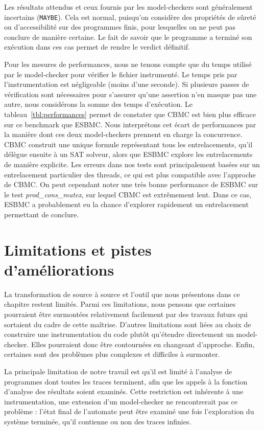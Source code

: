 Les résultats attendus et ceux fournis par les model-checkers sont généralement
incertains (\texttt{MAYBE}). Cela est normal, puisqu’on considère des
propriétés de sûreté ou d'accessibilité sur des programmes finis, pour
lesquelles on ne peut pas conclure de manière certaine. Le fait de savoir que le
programme a terminé son exécution dans ces cas permet de rendre le
verdict définitif.

Pour les mesures de performances, nous ne tenons compte que du temps utilisé par
le model-checker pour vérifier le fichier instrumenté. Le temps pris par
l'instrumentation est négligeable (moins d'une seconde). Si plusieurs passes de
vérification sont nécessaires pour s'assurer qu'une assertion n'en masque pas
une autre, nous considérons la somme des temps d'exécution. Le
tableau~\ref{tbl:performances} permet de constater que CBMC est bien plus
efficace sur ce benchmark que ESBMC. Nous interprétons cet écart de performances
par la manière dont ces deux model-checkers prennent en charge la concurrence.
CBMC construit une unique formule représentant tous les entrelacements, qu'il
délègue ensuite à un SAT solveur, alors que ESBMC explore les entrelacements de
manière explicite. Les erreurs dans nos tests sont principalement basées sur un
entrelacement particulier des threads, ce qui est plus compatible avec
l'approche de CBMC. On peut cependant noter une très bonne performance de ESBMC
sur le test \emph{prod\_cons\_mutex}, sur lequel CBMC est extrêmement lent. Dans
ce cas, ESBMC a probablement eu la chance d'explorer rapidement un entrelacement
permettant de conclure.

\section{Limitations et pistes d'améliorations}

La transformation de source à source et l'outil que nous présentons dans ce
chapitre restent limités. Parmi ces limitations, nous pensons que certaines
pourraient être surmontées relativement facilement par des travaux futurs qui
sortaient du cadre de cette maîtrise. D'autres limitations sont liées au choix
de construire une instrumentation du code plutôt qu'étendre directement un
model-checker. Elles pourraient donc être contournées en changeant d'approche.
Enfin, certaines sont des problèmes plus complexes et difficiles à surmonter.

La principale limitation de notre travail est qu'il est limité à l'analyse de
programmes dont toutes les traces terminent, afin que les appels à la fonction
d'analyse des résultats soient examinés. Cette restriction est inhérente à une
instrumentation, une extension d'un model-checker ne rencontrerait pas ce
problème : l'état final de l'automate peut être examiné une fois l'exploration
du système terminée, qu'il contienne ou non des traces infinies.

